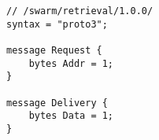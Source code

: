 \begin{definition}\label{def:retrieval-messages}

\begin{lstlisting}[]
// /swarm/retrieval/1.0.0/
syntax = "proto3";

message Request {
    bytes Addr = 1;
}

message Delivery {
    bytes Data = 1;
}

\end{lstlisting}
\end{definition}







